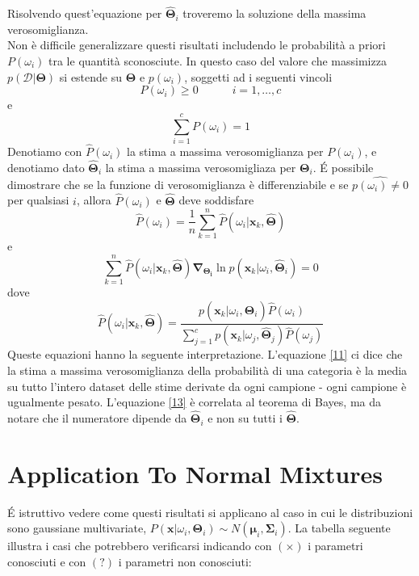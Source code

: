 Risolvendo quest'equazione per $\mathbf{\hat{\Theta}}_i$ troveremo la soluzione della massima verosomiglianza.\\
Non è difficile generalizzare questi risultati includendo le probabilità a priori $P(\omega_i)$ tra le quantità sconosciute. In questo caso del valore che massimizza $p(\mathcal{D|\mathbf{\Theta}})$
si estende su $\mathbf{\Theta}$ e $p(\omega_i)$, soggetti ad i seguenti vincoli
\begin{equation}
P(\omega_i) \geq 0 \quad \quad \quad i=1, \dots, c
\end{equation}
e
\begin{equation}
\sum_{i=1}^c P(\omega_i)  = 1 
\end{equation}
Denotiamo con $\hat{P}(\omega_i)$ la stima a massima verosomiglianza per $P(\omega_i)$, e denotiamo dato $\mathbf{\hat{\Theta}}_i$ la stima a massima verosomigliaza per $\mathbf{\Theta}_i$. \'E possibile dimostrare che se la funzione di verosomiglianza è differenziabile e se $\hat{p(\omega_i)\neq 0}$ per qualsiasi $i$, allora $\hat{P}(\omega_i)$ e $\mathbf{\hat{\Theta}}$ deve soddisfare
\begin{equation}\label{11}
\hat{P}(\omega_i) = \frac{1}{n} \sum_{k=1}^n \hat{P}(\omega_i | \mathbf{x}_k, \mathbf{\hat{\Theta}})
\end{equation}
e
\begin{equation}\label{12}
\sum_{k=1}^n \hat{P}(\omega_i|\mathbf{x}_k, \mathbf{\hat{\Theta}}) \mathbf{\nabla_{\mathbf{\Theta}_i}} \ln p(\mathbf{x}_k|\omega_i, \mathbf{\hat{\Theta}}_i) = 0
\end{equation}
dove
\begin{equation}\label{13}
\hat{P}(\omega_i|\mathbf{x}_k, \mathbf{\hat{\Theta}}) = \frac{p(\mathbf{x}_k|\omega_i, \mathbf{\hat{\Theta}}_i)\hat{P}(\omega_i)}{\sum_{j=1}^c p(\mathbf{x}_k|\omega_j, \mathbf{\hat{\Theta}}_j)\hat{P}(\omega_j)}
\end{equation}
Queste equazioni hanno la seguente interpretazione. L'equazione \ref{11} ci dice che la stima a massima verosomiglianza della probabilità di una categoria è la media su tutto l'intero dataset delle stime derivate da ogni campione - ogni campione è ugualmente pesato. L'equazione \ref{13} è correlata al teorema di Bayes, ma da notare che il numeratore dipende da $\mathbf{\hat{\Theta}}_i$ e non su tutti i $\mathbf{\hat{\Theta}}$.

\section{Application To Normal Mixtures}
\'E istruttivo vedere come questi risultati si applicano al caso in cui le distribuzioni sono gaussiane multivariate, $P(\mathbf{x}|\omega_i, \mathbf{\Theta}_i)\sim N(\mathbf{\mu}_i, \mathbf{\Sigma}_i)$. La tabella seguente illustra i casi che potrebbero verificarsi indicando con $(\times)$ i parametri conosciuti e con $(?)$ i parametri non conosciuti:

